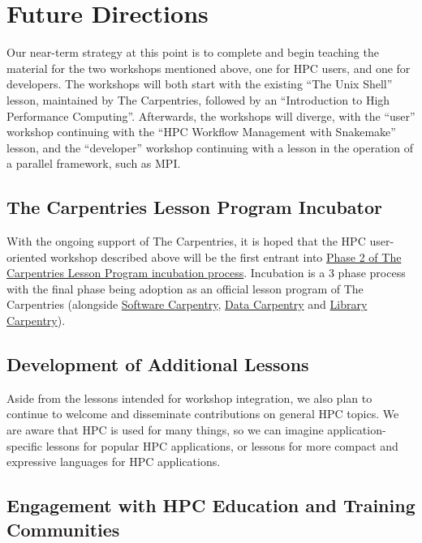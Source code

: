 \section{Future Directions}

Our near-term strategy at this point is to complete and begin teaching the material for the two workshops mentioned above, one for HPC users, and one for developers. The workshops will both start with the existing ``The Unix Shell'' lesson, maintained by The Carpentries, followed by an ``Introduction to High Performance Computing''. Afterwards, the workshops will diverge, with the ``user'' workshop continuing with the ``HPC Workflow Management with Snakemake'' lesson, and the ``developer'' workshop continuing with a lesson in the operation of a parallel framework, such as MPI.

\subsection{The Carpentries Lesson Program Incubator}

With the ongoing support of The Carpentries, it is hoped that the HPC user-oriented workshop described above will be the first entrant into \href{https://docs.carpentries.org/topic_folders/governance/lesson-program-policy.html#phase-2-incubation}{Phase 2 of The Carpentries Lesson Program incubation process}. Incubation is a 3 phase process with the final phase being adoption as an official lesson program of The Carpentries (alongside \href{https://software-carpentry.org/}{Software Carpentry}, \href{https://datacarpentry.org/}{Data Carpentry} and \href{https://librarycarpentry.org/}{Library Carpentry}).

\subsection{Development of Additional Lessons}

Aside from the lessons intended for workshop integration, we also plan to continue to welcome and disseminate contributions on general HPC topics. We are aware that HPC is used for many things, so we can imagine application-specific lessons for popular HPC applications, or lessons for more compact and expressive languages for HPC applications.

\subsection{Engagement with HPC Education and Training Communities}

